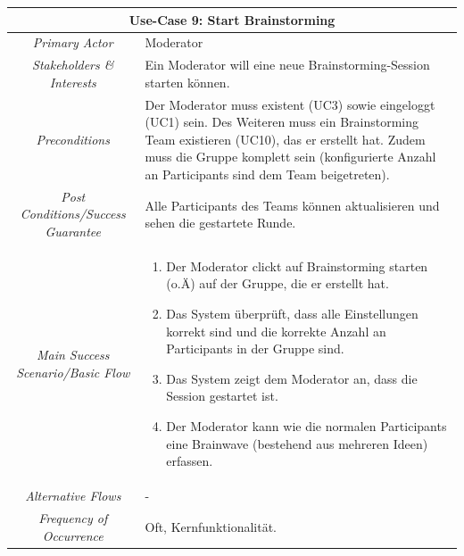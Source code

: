 \renewcommand{\arraystretch}{1.35}
\begin{center}
	\begin{longtable}{| c | p{7cm} |}
		\hline
		\multicolumn{2}{|c|}{\textbf{Use-Case 9: Start Brainstorming}}\\
		\hline\hline
		\textit{Primary Actor} & Moderator\\
		\hline
		\textit{Stakeholders \& Interests} & Ein Moderator will eine neue Brainstorming-Session starten können. \\
		\hline
		\textit{Preconditions} & Der Moderator muss existent (UC3) sowie eingeloggt (UC1) sein. Des Weiteren muss ein Brainstorming Team existieren (UC10), das er erstellt hat. Zudem muss die Gruppe komplett sein (konfigurierte Anzahl an Participants sind dem Team beigetreten). \\
		\hline
		\textit{Post Conditions/Success Guarantee} & Alle Participants des Teams können aktualisieren und sehen die gestartete Runde. \\
		\hline
		\textit{Main Success Scenario/Basic Flow} & 
		\begin{enumerate}[noitemsep]
			\item Der Moderator clickt auf \grqq Brainstorming starten\grqq{} (o.Ä) auf der Gruppe, die er erstellt hat. 
			\item Das System überprüft, dass alle Einstellungen korrekt sind und die korrekte Anzahl an Participants in der Gruppe sind. 
			\item Das System zeigt dem Moderator an, dass die Session gestartet ist.
			\item Der Moderator kann wie die normalen Participants eine Brainwave (bestehend aus mehreren Ideen) erfassen.
		\end{enumerate}\\
		\hline
		\textit{Alternative Flows} & -\\
		
		\hline
		
		\textit{Frequency of Occurrence} & Oft, Kernfunktionalität.\\
		
		\hline
	\end{longtable}
\end{center}




